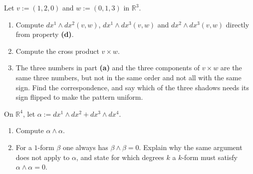 \begin{aiexercise}
\label{ex:ai_three_shadows}
Let $v := (1,2,0)$ and $w := (0,1,3)$ in $\mathbb{R}^3$.
\begin{enumerate}[label=\textbf{(\alph*)}]
  \item Compute $dx^1\wedge dx^2(v,w)$, $dx^1\wedge dx^3(v,w)$ and $dx^2\wedge dx^3(v,w)$
    directly from property \textbf{(d)}.
  \item Compute the cross product $v \times w$.
  \item The three numbers in part \textbf{(a)} and the three components of $v \times w$ are the
    same three numbers, but not in the same order and not all with the same sign. Find the
    correspondence,
    and say which of the three shadows needs its sign flipped to make the pattern uniform.
\end{enumerate}
\end{aiexercise}

\begin{aiexercise}
\label{ex:ai_wedge_square}
On $\mathbb{R}^4$, let $\alpha := dx^1\wedge dx^2 + dx^3\wedge dx^4$.
\begin{enumerate}[label=\textbf{(\alph*)}]
  \item Compute $\alpha\wedge\alpha$.
  \item For a $1$-form $\beta$ one always has $\beta\wedge\beta = 0$. Explain why the same
    argument does not apply to $\alpha$, and state for which degrees $k$ a $k$-form must satisfy
    $\alpha\wedge\alpha = 0$.
\end{enumerate}
\end{aiexercise}
